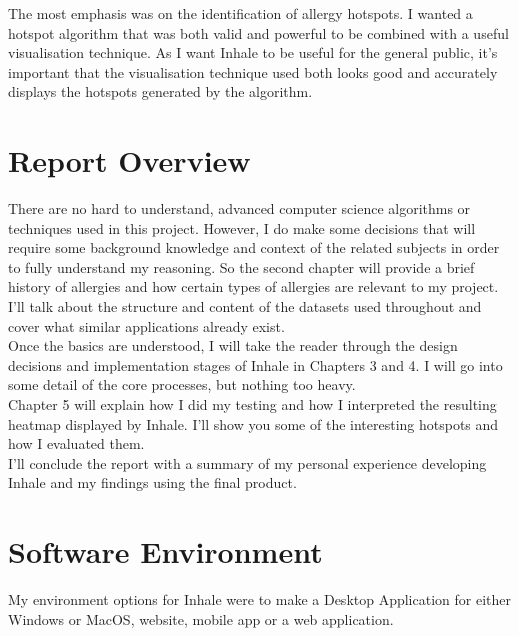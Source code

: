 The most emphasis was on the identification of allergy hotspots. I wanted a hotspot algorithm that was both valid and  powerful to be combined with a useful visualisation technique. As I want Inhale to be useful for the general public, it's important that the visualisation technique used both looks good and accurately displays the hotspots generated by the algorithm.\\


\section{Report Overview}

There are no hard to understand, advanced computer science algorithms or techniques used in this project. However, I do make some decisions that will require some background knowledge and context of the related subjects in order to fully understand my reasoning. So the second chapter will provide a brief history of allergies and how certain types of allergies are relevant to my project.\\

I'll talk about the structure and content of the datasets used throughout and cover what similar applications already exist.\\

Once the basics are understood, I will take the reader through the design decisions and implementation stages of Inhale in Chapters 3 and 4. I will go into some detail of the core processes, but nothing too heavy.\\

Chapter 5 will explain how I did my testing and how I interpreted the resulting heatmap displayed by Inhale. I'll show you some of the interesting hotspots and how I evaluated them.\\

I'll conclude the report with a summary of my personal experience developing Inhale and my findings using the final product.\\
    

\section{Software Environment}

My environment options for Inhale were to make a Desktop Application for either Windows or MacOS, website, mobile app or a web application.\\

